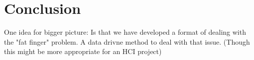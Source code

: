 \section{Conclusion}

One idea for bigger picture: Is that we have developed a format of dealing with the "fat finger" problem. A data drivne method to deal with that issue. (Though this might be more appropriate for an HCI project)

